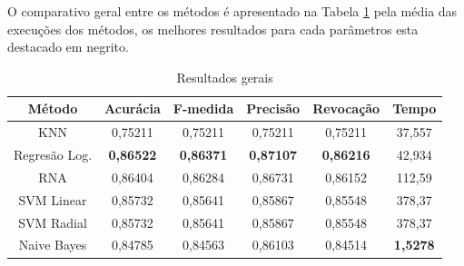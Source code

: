 O comparativo geral entre os métodos é apresentado na Tabela \ref{table:resultadosGerais} pela média das execuções dos métodos, os melhores resultados para cada parâmetros esta destacado em negrito.

\begin{table}[h]
\centering
\caption{Resultados gerais}
\vspace{0.2cm}
\begin{tabular}{c|c|c|c|c|c}
Método & Acurácia & F-medida & Precisão & Revocação & Tempo \\
\hline
KNN                & 0,75211 & 0,75211 & 0,75211 & 0,75211 & 37,557 \\
Regresão Log. & \textbf{0,86522} & \textbf{0,86371} & \textbf{0,87107} & \textbf{0,86216} & 42,934 \\
RNA                & 0,86404 & 0,86284 & 0,86731 & 0,86152 & 112,59 \\
SVM Linear         & 0,85732 & 0,85641 & 0,85867 & 0,85548 & 378,37 \\
SVM Radial         & 0,85732 & 0,85641 & 0,85867 & 0,85548 & 378,37 \\
Naive Bayes        & 0,84785 & 0,84563 & 0,86103 & 0,84514 & \textbf{1,5278} \\
\end{tabular}
\label{table:resultadosGerais}
\end{table}


